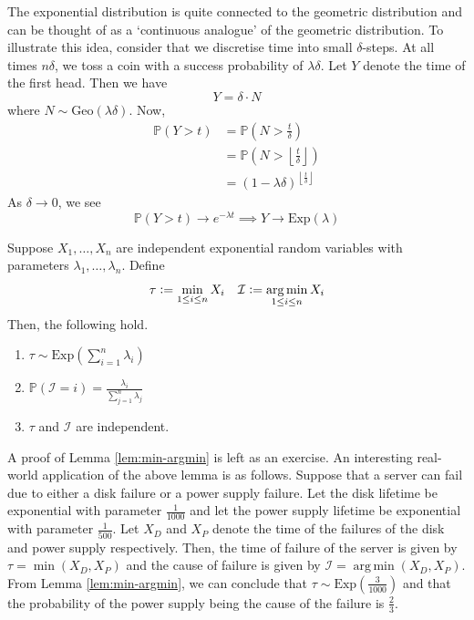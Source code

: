 \documentclass[12pt]{article}
\def\P{\mathbb{P}}
\def\ddfrac#1#2{\displaystyle\frac{\displaystyle #1}{\displaystyle #2}}
\theoremstyle{definition}
\DeclareMathOperator*{\argmin}{arg\,min}
\begin{document}
    The exponential distribution is quite connected to the geometric distribution and can be thought of as a `continuous analogue' of the geometric distribution. To illustrate this idea, consider that we discretise time into small $\delta$-steps. At all times $n\delta$, we toss a coin with a success probability of $\lambda\delta$. Let $Y$ denote the time of the first head. Then we have
    \[
        Y = \delta \cdot N
    \]
    where $N \sim \text{Geo}(\lambda \delta)$. Now, 
    \begin{align*}
        \P(Y > t) &= \P \left( N > \frac{t}{\delta} \right) \\
        &= \P \left( N > \left\lfloor \frac{t}{\delta} \right\rfloor \right) \\
        &= \left( 1 - \lambda \delta \right)^{\left\lfloor \frac{t}{\delta} \right\rfloor}
    \end{align*}
    As $\delta \to 0$, we see
    \[
        \P(Y > t) \to e^{-\lambda t} \implies Y \to \text{Exp}(\lambda)
    \]
    
    \begin{lem} \label{lem:min-argmin}
        Suppose $X_1, \ldots , X_n$ are independent exponential random variables with parameters $\lambda_1, \ldots, \lambda_n$. Define
        \[
            \tau \vcentcolon= \min_{1 \leq i \leq n} X_i \quad \mathcal{I} \vcentcolon= \argmin_{1 \leq i \leq n} X_i
        \]
        Then, the following hold.
        \begin{enumerate}
            \item $\tau \sim \text{Exp} \left( \sum_{i=1}^n \lambda_i \right)$
            \item $\P(\mathcal{I} = i) = \ddfrac{\lambda_i}{\sum_{j=1}^n \lambda_j}$
            \item $\tau$ and $\mathcal{I}$ are independent.
        \end{enumerate}
    \end{lem}
    
    A proof of Lemma \ref{lem:min-argmin} is left as an exercise. An interesting real-world application of the above lemma is as follows. Suppose that a server can fail due to either a disk failure or a power supply failure. Let the disk lifetime be exponential with parameter $\frac{1}{1000}$ and let the power supply lifetime be exponential with parameter $\frac{1}{500}$. Let $X_D$ and $X_P$ denote the time of the failures of the disk and power supply respectively. Then, the time of failure of the server is given by $\tau = \min(X_D, X_P)$ and the cause of failure is given by $\mathcal{I} = \argmin(X_D, X_P)$. From Lemma \ref{lem:min-argmin}, we can conclude that $\tau \sim \text{Exp} \left( \frac{3}{1000} \right)$ and that the probability of the power supply being the cause of the failure is $\frac{2}{3}$.
    
\end{document}

